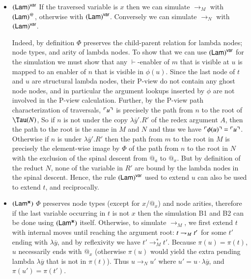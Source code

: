\documentclass{elsarticle}
\theoremstyle{plain}
\theoremstyle{definition}
\newcommand{\ghostvar}{\mathsf{x\mkern-5mu x}}
\def\coresymbol{\pi} %
\newcommand{\core}[1]{\coresymbol(#1)} %
\newcommand{\enables}{\vdash} %
\newcommand{\ctree}{\Tau} %
\begin{document}
\begin{itemize}[itemindent=0.1em, leftmargin=0.4em]
    \item $\mathbf{({\sf Lam})}^{\sf var}$
    If the traversed variable is $x$ then
    we can simulate $\rightarrow_M$
     with  $\mathbf{({\sf Lam})}^@$, otherwise with
     $\mathbf{({\sf Lam})}^{\sf var}$.
     Conversely we can simulate $\rightarrow_N$ with
     $\mathbf{({\sf Lam})}^{\sf var}$.

    Indeed, by definition $\Phi$ preserves the child-parent relation for lambda nodes; node types, and arity of lambda nodes.
    To show that we can use $\mathbf{({\sf Lam})}^{\sf var}$ for the simulation we must show that any $\enables$-enabler of $m$ that is visible at $u$ is mapped to an enabler of $n$ that is visible in $\phi(u)$.
    Since the last node of $t$ and $u$ are structural lambda nodes, their P-view do not contain any ghost node nodes, and in particular the argument lookups inserted by $\phi$ are not involved in the P-view calculation.
    Further, by the P-view path characterization of traversals, $\ulcorner u \urcorner$ is precisely the path from $n$ to the root of $\ctree(N)$,
    So if $n$ is not under the copy $\lambda\overline{y}'.R'$ of the redex argument $A$, then the path to the root is the same in $M$ and $N$ and thus we have $\ulcorner \phi(u) \urcorner = \ulcorner u \urcorner$.
    Otherwise if $n$ is under $\lambda\overline{y}'.R'$ then the path from $m$ to the root in $M$ is precisely the element-wise image by $\Phi$ of the path from $n$ to the root in $N$ with the exclusion of the spinal descent from $@_a$ to $@_x$. But by definition of the reduct $N$, none of the variable in $R'$ are bound by the lambda nodes in the spinal descent.
    Hence, the rule $\mathbf{({\sf Lam})}^{\sf var}$ used to extend  $u$ can also be used to extend $t$, and reciprocally.

    \item $\rulename{Lam^\ghostvar}$
    $\Phi$ preserves node types (except for $x$/$@_x$)
    and node arities, therefore if the last variable occurring in $t$ is not $x$ then the simulation B1 and B2 can be done using $\rulename{Lam^\ghostvar}$ itself.
    Otherwise, to simulate $\rightarrow_M$, we first extend $t$ with internal moves
    until reaching the argument root: $t \rightharpoondown_M t'$ for some $t'$ ending with $\lambda\overline{y}$, and by reflexivity we have $t' \rightarrow_M^* t'$.
    Because $\core{u} = \core{t}$, $u$ necessarily ends with $@_x$ (otherwise
    $\core{u}$ would yield the extra pending lambda  $\lambda\overline{y}$ that is not in $\core{t}$).
    Thus $u \rightarrow_N u'$ where $u' = u \cdot \lambda\overline{y}$,
    and $\core{u'} = \core{t'}$.


\end{itemize}
\end{document}
